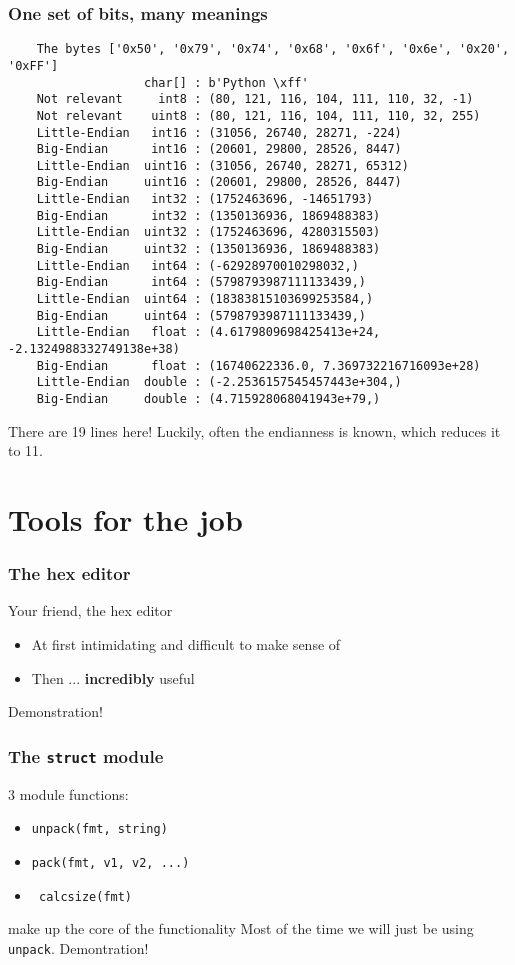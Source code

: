 \documentclass{beamer}
\begin{document}
\begin{frame}[fragile]
  \frametitle{One set of bits, many meanings}
  \scriptsize
  \begin{verbatim}
    The bytes ['0x50', '0x79', '0x74', '0x68', '0x6f', '0x6e', '0x20', '0xFF']
                   char[] : b'Python \xff'
    Not relevant     int8 : (80, 121, 116, 104, 111, 110, 32, -1)
    Not relevant    uint8 : (80, 121, 116, 104, 111, 110, 32, 255)
    Little-Endian   int16 : (31056, 26740, 28271, -224)
    Big-Endian      int16 : (20601, 29800, 28526, 8447)
    Little-Endian  uint16 : (31056, 26740, 28271, 65312)
    Big-Endian     uint16 : (20601, 29800, 28526, 8447)
    Little-Endian   int32 : (1752463696, -14651793)
    Big-Endian      int32 : (1350136936, 1869488383)
    Little-Endian  uint32 : (1752463696, 4280315503)
    Big-Endian     uint32 : (1350136936, 1869488383)
    Little-Endian   int64 : (-62928970010298032,)
    Big-Endian      int64 : (5798793987111133439,)
    Little-Endian  uint64 : (18383815103699253584,)
    Big-Endian     uint64 : (5798793987111133439,)
    Little-Endian   float : (4.6179809698425413e+24, -2.1324988332749138e+38)
    Big-Endian      float : (16740622336.0, 7.369732216716093e+28)
    Little-Endian  double : (-2.2536157545457443e+304,)
    Big-Endian     double : (4.715928068041943e+79,)
  \end{verbatim}
  \normalsize
  There are 19 lines here! Luckily, often the endianness is known, which reduces it to 11.
\end{frame}

\section{Tools for the job}
\begin{frame}
  \frametitle{The hex editor}
  \begin{block}{Your friend, the hex editor}
    \begin{itemize}
    \item At first intimidating and difficult to make sense of
    \item Then ... \textbf{incredibly} useful
    \end{itemize}  
  \end{block}
  \huge
  \vspace{2cm}
  Demonstration!
\end{frame}

\begin{frame}
  \frametitle{The \texttt{struct} module}
  3 module functions:\newline
  \begin{itemize}
  \item \texttt{unpack(fmt, string)}
  \item \texttt{pack(fmt, v1, v2, ...)}
  \item   \texttt{  calcsize(fmt)}
  \end{itemize}
  make up the core of the functionality\newline
  \newline
  Most of the time we will just be using \texttt{unpack}.
  \huge
  Demontration!
\end{frame}
\end{document}
